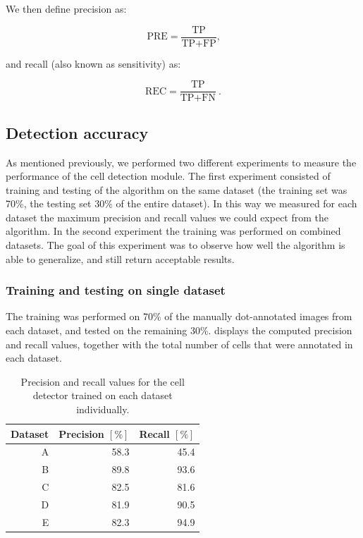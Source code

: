 	We then define precision as:
	
	\[
		\text{PRE} = \frac{\text{TP}}{\text{TP}+\text{FP}}\text{,}
	\]
	
	\noindent and recall (also known as sensitivity) as:
	
	\[
		\text{REC} = \frac{\text{TP}}{\text{TP} + \text{FN}}\ \text{.}
	\]
	
	\subsection{Detection accuracy \statusnew}
			
		As mentioned previously, we performed two different experiments to measure the performance of the cell detection module. The first experiment consisted of training and testing of the algorithm on the same dataset (the training set was 70\%, the testing set 30\% of the entire dataset). In this way we measured for each dataset the maximum precision and recall values we could expect from the algorithm. In the second experiment the training was performed on combined datasets. The goal of this experiment was to observe how well the algorithm is able to generalize, and still return acceptable results.
		
		\subsubsection{Training and testing on single dataset}
		
		The training was performed on 70\% of the manually dot-annotated images from each dataset, and tested on the remaining 30\%.  displays the computed precision and recall values, together with the total number of cells that were annotated in each dataset.
		
		
		\begin{table}[h]
			\centering
			\begin{tabular}{rrr}
				Dataset & Precision $\left[ \% \right]$ & Recall $\left[ \% \right]$ \\
			\hline
				      A &                          58.3 &                       45.4 \\
				      B &                          89.8 &                       93.6 \\
				      C &                          82.5 &                       81.6 \\
				      D &                          81.9 &                       90.5 \\
				      E &                          82.3 &                       94.9
			\end{tabular} 
			\caption{Precision and recall values for the cell detector trained on each dataset individually.}
			\label{tab:results_detector_individual}
		\end{table}
		
